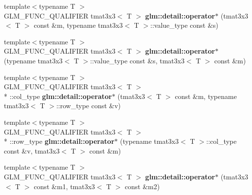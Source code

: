 \begin{DoxyCompactItemize}
\item 
\hypertarget{namespaceglm_1_1detail_ab075b7e9145c0c0892052b7e38451868}{{\footnotesize template$<$typename T $>$ }\\G\-L\-M\-\_\-\-F\-U\-N\-C\-\_\-\-Q\-U\-A\-L\-I\-F\-I\-E\-R tmat3x3$<$ T $>$ {\bfseries glm\-::detail\-::operator$\ast$} (tmat3x3$<$ T $>$ const \&m, typename tmat3x3$<$ T $>$\-::value\-\_\-type const \&s)}\label{namespaceglm_1_1detail_ab075b7e9145c0c0892052b7e38451868}

\item 
\hypertarget{namespaceglm_1_1detail_a602575d0150ac614e3018d945ef31522}{{\footnotesize template$<$typename T $>$ }\\G\-L\-M\-\_\-\-F\-U\-N\-C\-\_\-\-Q\-U\-A\-L\-I\-F\-I\-E\-R tmat3x3$<$ T $>$ {\bfseries glm\-::detail\-::operator$\ast$} (typename tmat3x3$<$ T $>$\-::value\-\_\-type const \&s, tmat3x3$<$ T $>$ const \&m)}\label{namespaceglm_1_1detail_a602575d0150ac614e3018d945ef31522}

\item 
\hypertarget{namespaceglm_1_1detail_a20e9e4ae1d4b6269af47d45c32165ead}{{\footnotesize template$<$typename T $>$ }\\G\-L\-M\-\_\-\-F\-U\-N\-C\-\_\-\-Q\-U\-A\-L\-I\-F\-I\-E\-R tmat3x3$<$ T $>$\\*
\-::col\-\_\-type {\bfseries glm\-::detail\-::operator$\ast$} (tmat3x3$<$ T $>$ const \&m, typename tmat3x3$<$ T $>$\-::row\-\_\-type const \&v)}\label{namespaceglm_1_1detail_a20e9e4ae1d4b6269af47d45c32165ead}

\item 
\hypertarget{namespaceglm_1_1detail_a2b76346067dd63fab9e3cfa397259b3b}{{\footnotesize template$<$typename T $>$ }\\G\-L\-M\-\_\-\-F\-U\-N\-C\-\_\-\-Q\-U\-A\-L\-I\-F\-I\-E\-R tmat3x3$<$ T $>$\\*
\-::row\-\_\-type {\bfseries glm\-::detail\-::operator$\ast$} (typename tmat3x3$<$ T $>$\-::col\-\_\-type const \&v, tmat3x3$<$ T $>$ const \&m)}\label{namespaceglm_1_1detail_a2b76346067dd63fab9e3cfa397259b3b}

\item 
\hypertarget{namespaceglm_1_1detail_a760b11487e92287a195d540c867c286a}{{\footnotesize template$<$typename T $>$ }\\G\-L\-M\-\_\-\-F\-U\-N\-C\-\_\-\-Q\-U\-A\-L\-I\-F\-I\-E\-R tmat3x3$<$ T $>$ {\bfseries glm\-::detail\-::operator$\ast$} (tmat3x3$<$ T $>$ const \&m1, tmat3x3$<$ T $>$ const \&m2)}\label{namespaceglm_1_1detail_a760b11487e92287a195d540c867c286a}


\end{DoxyCompactItemize}
